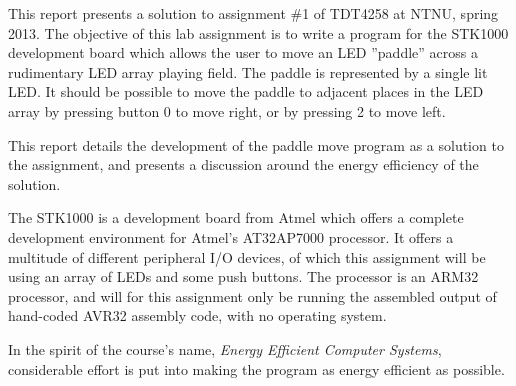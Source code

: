 This report presents a solution to assignment \#1 of TDT4258 at NTNU, spring 2013.  
The objective of this lab assignment is to write a program for the STK1000 development board which allows the user to move an LED ''paddle'' across a rudimentary LED array playing field.
The paddle is represented by a single lit LED.
It should be possible to move the paddle to adjacent places in the LED array by pressing button 0 to move right, or by pressing 2 to move left.

This report details the development of the paddle move program as a solution to the assignment, and presents a discussion around the energy efficiency of the solution.

The STK1000 is a development board from Atmel which offers a complete development environment for Atmel's AT32AP7000 processor. It offers a multitude of different peripheral I/O devices, of which this assignment will be using an array of LEDs and some push buttons. The processor is an ARM32 processor, and will for this assignment only be running the assembled output of hand-coded AVR32 assembly code, with no operating system.

In the spirit of the course's name, \emph{Energy Efficient Computer Systems}, considerable effort is put into making the program as energy efficient as possible.

